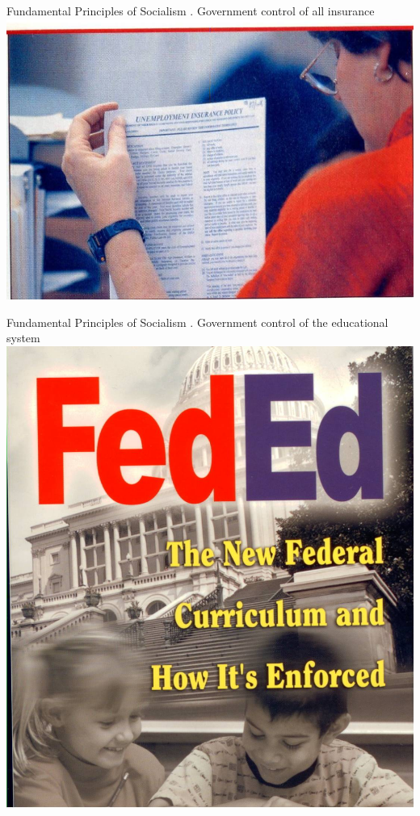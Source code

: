 \begin{frame}{Fundamental Principles of Socialism}
    . Government control of all insurance \\
    \includegraphics[width=.9\textwidth]{img/insurance.jpg} \\
\end{frame}

\begin{frame}{Fundamental Principles of Socialism}
    . Government control of the educational system \\
    \includegraphics[height=.9\textheight]{img/education.jpg} \\
\end{frame}

